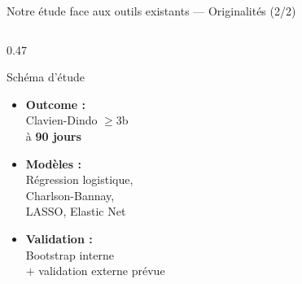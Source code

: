 \documentclass[aspectratio=169]{beamer}
\begin{document}
\begin{frame}{Notre étude face aux outils existants --- Originalités (2/2)}
\begin{columns}[T]
\begin{column}{0.47\textwidth}
\begin{block}{Schéma d'étude}
\begin{itemize}
          \item \textbf{Outcome :}\\
                Clavien-Dindo $\geq$3b\\
                à \textbf{90 jours}\\[4pt]
          \item \textbf{Modèles :}\\
                Régression logistique,\\
                Charlson-Bannay,\\
                LASSO, Elastic Net\\[4pt]
          \item \textbf{Validation :}\\
                Bootstrap interne\\
                + validation externe prévue
        \end{itemize}
      \end{block}
    \end{column}
  \end{columns}
\end{frame}
\end{document}
